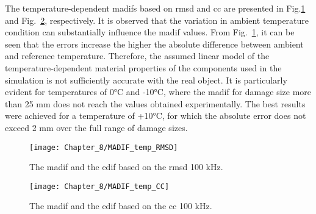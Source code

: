 The temperature-dependent \acp{madif} based on \ac{rmsd} and \ac{cc} are presented in Fig.\ref{fig:madif_temp_rmsd} and Fig.~\ref{fig:madif_temp_cc}, respectively.
It is observed that the variation in ambient temperature condition can substantially influence the \ac{madif} values.
From Fig.~\ref{fig:madif_temp_rmsd}, it can be seen that the errors increase the higher the absolute difference between ambient and reference temperature.
Therefore, the assumed linear model of the temperature-dependent material properties of the components used in the simulation is not sufficiently accurate with the real object.
It is particularly evident for temperatures of 0\unit{\degreeCelsius} and -10\unit{\degreeCelsius}, where the \ac{madif} for damage size more than 25 \unit{\mm} does not reach the values obtained experimentally.
The best results were achieved for a temperature of +10\unit{\degreeCelsius}, for which the absolute error does not exceed 2 mm over the full range of damage sizes. 
\begin{figure}[!tbh]
	\begin{center}
		\texttt{[image: Chapter\_8/MADIF\_temp\_RMSD]}
	\end{center}
	\caption{The \acf{madif} and the \acf{edif} based on the \acf{rmsd} 100 \unit{\kHz}.}
	\label{fig:madif_temp_rmsd}
\end{figure}
\begin{figure}
	\begin{center}
		\texttt{[image: Chapter\_8/MADIF\_temp\_CC]}
	\end{center}
	\caption{The \acf{madif} and the \acf{edif} based on the \acf{cc} 100 \unit{\kHz}.}
	\label{fig:madif_temp_cc}
\end{figure}
